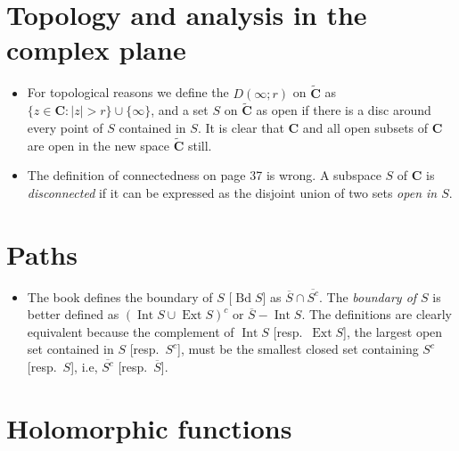 \documentclass[11pt]{article}
\newcommand{\df}[1]{\textit{\textsf{#1}}} %
\newcommand{\C}{\mathbf{C}}
\newcommand{\eC}{\widetilde{\C}}
\newcommand{\clos}[1]{\overline{#1}}
\newcommand{\nm}[1]{\lVert #1 \rVert}
\newcommand{\abs}[1]{\lvert #1 \rvert}
\newcommand{\Bd}{\operatorname{Bd}}
\begin{document}
\section{Topology and analysis in the complex plane}
\begin{itemize}
    \item For topological reasons we define the $D(\infty; r)$ on $\eC$ as $\{z \in \C : \abs{z} > r\} \cup \{\infty\}$, and a set $S$ on $\eC$ as open if there is a disc around every point of $S$ contained in $S$. It is clear that $\C$ and all open subsets of $\C$ are open in the new space $\eC$ still.
    \item The definition of connectedness on page 37 is wrong. A subspace $S$ of $\C$ is \df{disconnected} if it can be expressed as the disjoint union of two  sets \textit{open in $S$}.
    
\end{itemize}

\section{Paths}
\begin{itemize}
    \item The book defines the boundary of $S$ [$\Bd S$] as $\clos{S} \cap \clos{S^c}$. The \df{boundary of $S$} is better defined as $(\operatorname{Int} S \cup \operatorname{Ext} S)^c$ or $\clos{S}-\operatorname{Int} S$. The definitions are clearly equivalent because the complement of $\operatorname{Int} S$ [resp.\ $\operatorname{Ext} S$], the largest open set contained in $S$ [resp.\ $S^c$], must be the smallest closed set containing $S^c$ [resp.\ $S$], i.e, $\clos{S^c}$ [resp.\ $\clos{S}$].
\end{itemize}

\section{Holomorphic functions}
\end{document}
